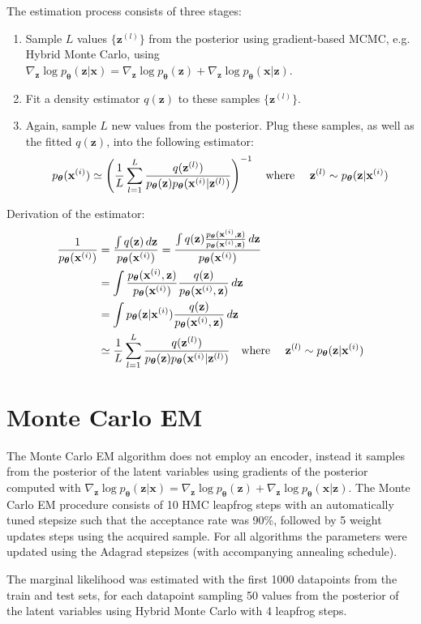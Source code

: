 \documentclass{article} %
\theoremstyle{definition}
\newcommand{\bb}[1]{\mathbf{#1}}
\newcommand{\bx}{\bb{x}}
\newcommand{\bxi}{\bx^{(i)}}
\newcommand{\bz}{\bb{z}}
\newcommand{\bzl}{\bz^{(l)}}
\newcommand{\bT}{\boldsymbol{\theta}}
\newcommand{\pT}{p_{\bT}}
\theoremstyle{definition}
\begin{document}
The estimation process consists of three stages:
\begin{enumerate}
\item Sample $L$ values $\{\bzl\}$ from the posterior using gradient-based MCMC, e.g. Hybrid Monte Carlo, using $\nabla_{\bz} \log \pT(\bz|\bx) = \nabla_{\bz} \log \pT(\bz) + \nabla_{\bz} \log \pT(\bx|\bz)$.
\item Fit a density estimator $q(\bz)$ to these samples $\{\bzl\}$.
\item Again, sample $L$ new values from the posterior. Plug these samples, as well as the fitted $q(\bz)$, into the following estimator:
\begin{align*}
\pT(\bxi) \simeq \left( \frac{1}{L} \sum_{l=1}^L \frac{q(\bzl)}{\pT(\bz) \pT(\bxi|\bzl)} \right)^{-1} \text{\quad where \quad} \bzl \sim \pT(\bz|\bxi)
\end{align*}
\end{enumerate}

Derivation of the estimator:
\begin{align*}
\frac{1}{\pT(\bxi)} 
&= \frac{\int q(\bz) \,d\bz}{\pT(\bxi)}
= \frac{\int q(\bz) \frac{\pT(\bxi, \bz) }{\pT(\bxi, \bz)} \,d\bz}{\pT(\bxi)} \\
&= \int \frac{\pT(\bxi, \bz)}{\pT(\bxi)} \frac{q(\bz)}{\pT(\bxi, \bz)} \,d\bz \\
&= \int \pT(\bz|\bxi) \frac{q(\bz)}{\pT(\bxi, \bz)} \,d\bz \\
&\simeq \frac{1}{L} \sum_{l=1}^L \frac{q(\bzl)}{\pT(\bz) \pT(\bxi|\bzl)} \text{\quad where \quad} \bzl \sim \pT(\bz|\bxi)
\end{align*}

\section{Monte Carlo EM}
The Monte Carlo EM algorithm does not employ an encoder, instead it samples from the posterior of the latent variables using gradients of the posterior computed with $\nabla_{\bz} \log \pT(\bz|\bx) = \nabla_{\bz} \log \pT(\bz) + \nabla_{\bz} \log \pT(\bx|\bz)$. The Monte Carlo EM procedure consists of 10 HMC leapfrog steps with an automatically tuned stepsize such that the acceptance rate was 90\%, followed by 5 weight updates steps using the acquired sample. For all algorithms the parameters were updated using the Adagrad stepsizes (with accompanying annealing schedule).

The marginal likelihood was estimated with the first 1000 datapoints from the train and test sets, for each datapoint sampling 50 values from the posterior of the latent variables using Hybrid Monte Carlo with 4 leapfrog steps. 
\end{document}
